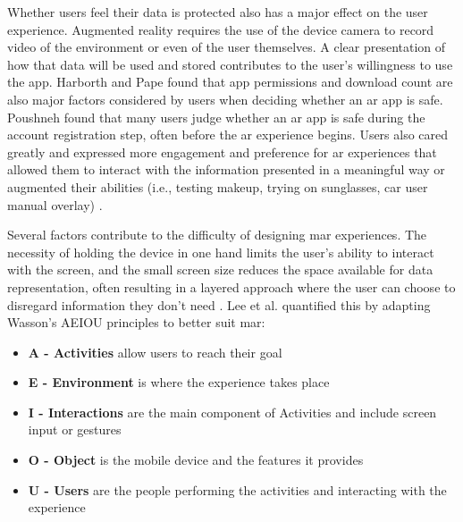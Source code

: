 \documentclass[thesis]{fputhesis}
\begin{document}
\begin{body}
Whether users feel their data is protected also has a major effect on the user experience. Augmented reality requires the use of the device camera to record video of the environment or even of the user themselves. A clear presentation of how that data will be used and stored contributes to the user's willingness to use the app. Harborth and Pape \cite{harborth_investigating_2021} found that app permissions and download count are also major factors considered by users when deciding whether an \acrshort{ar} app is safe. Poushneh \cite{poushneh_augmented_2018} found that many users judge whether an \acrshort{ar} app is safe during the account registration step, often before the \acrshort{ar} experience begins.
Users also cared greatly and expressed more engagement and preference for \acrshort{ar} experiences that allowed them to interact with the information presented in a meaningful way or augmented their abilities (i.e., testing makeup, trying on sunglasses, car user manual overlay) \cite{poushneh_augmented_2018}. 

Several factors contribute to the difficulty of designing \acrfull{mar} experiences. The necessity of holding the device in one hand limits the user's ability to interact with the screen, and the small screen size reduces the space available for data representation, often resulting in a layered approach where the user can choose to disregard information they don't need \cite{kourouthanassis_demystifying_2015}. Lee et al. \cite{lee_ar_2012} quantified this by adapting Wasson's AEIOU principles \cite{wasson_ethnography_2000} to better suit \acrfull{mar}:
\begin{itemize}
    \item \textbf{A - Activities} allow users to reach their goal
    \item \textbf{E - Environment} is where the experience takes place
    \item \textbf{I - Interactions} are the main component of Activities and include screen input or gestures
    \item \textbf{O - Object} is the mobile device and the features it provides
    \item \textbf{U - Users} are the people performing the activities and interacting with the experience
\end{itemize}


\end{body}
\end{document}
